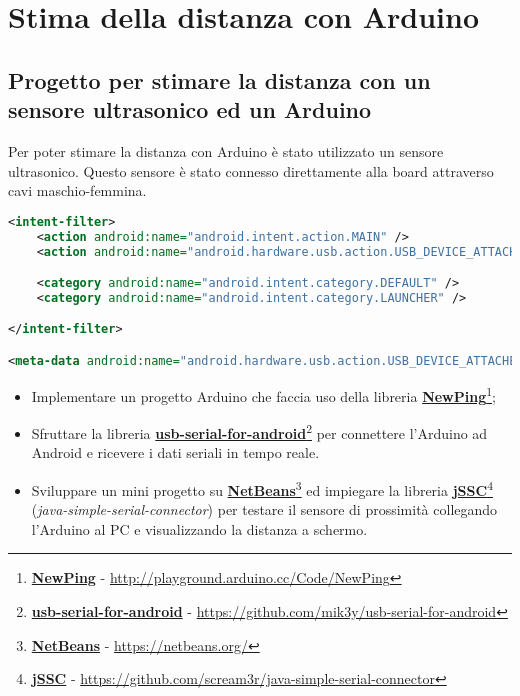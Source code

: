 \chapter{Stima della distanza con Arduino}
\section{Progetto per stimare la distanza con un sensore ultrasonico ed un Arduino}
Per poter stimare la distanza con Arduino è stato utilizzato un sensore ultrasonico. Questo sensore è stato connesso direttamente alla board attraverso cavi maschio-femmina.

\begin{lstlisting}[language=XML]
<intent-filter>
	<action android:name="android.intent.action.MAIN" />
	<action android:name="android.hardware.usb.action.USB_DEVICE_ATTACHED"/>

	<category android:name="android.intent.category.DEFAULT" />
	<category android:name="android.intent.category.LAUNCHER" />

</intent-filter>

<meta-data android:name="android.hardware.usb.action.USB_DEVICE_ATTACHED" android:resource="@xml/device_filter" />
\end{lstlisting}



\begin{itemize}
	 \item Implementare un progetto Arduino che faccia uso della libreria \href{http://playground.arduino.cc/Code/NewPing}{\textbf{NewPing}}\footnote{\href{http://playground.arduino.cc/Code/NewPing}{\textbf{NewPing}} - \url{http://playground.arduino.cc/Code/NewPing}};
	 
	 \item Sfruttare la libreria \href{https://github.com/mik3y/usb-serial-for-android}{\textbf{usb-serial-for-android}}\footnote{\href{https://github.com/mik3y/usb-serial-for-android}{\textbf{usb-serial-for-android}} - \url{https://github.com/mik3y/usb-serial-for-android}} per connettere l'Arduino ad Android e ricevere i dati seriali in tempo reale.
	 
	 \item Sviluppare un mini progetto su \href{https://netbeans.org/}{\textbf{NetBeans}}\footnote{\href{https://netbeans.org/}{\textbf{NetBeans}} - \url{https://netbeans.org/}} ed impiegare la libreria \href{https://github.com/scream3r/java-simple-serial-connector}{\textbf{jSSC}}\footnote{\href{https://github.com/scream3r/java-simple-serial-connector}{\textbf{jSSC}} - \url{https://github.com/scream3r/java-simple-serial-connector}} (\textit{java-simple-serial-connector}) per testare il sensore di prossimità collegando l'Arduino al PC e visualizzando la distanza a schermo.
\end{itemize}

